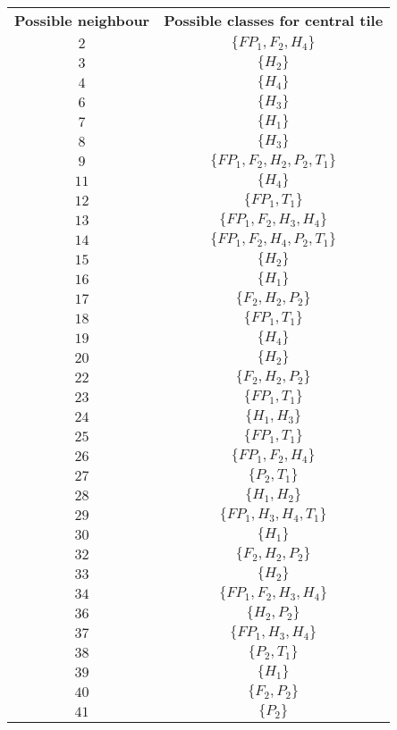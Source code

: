 \begin{table}[htp!]
\begin{center}
\begin{tabular}{|c|c|}
\textbf{Possible neighbour} & \textbf{Possible classes for central tile}\\
$2$ & $\{FP_1, F_2, H_4\}$\\
$3$ & $\{H_2\}$\\
$4$ & $\{H_4\}$\\
$6$ & $\{H_3\}$\\
$7$ & $\{H_1\}$\\
$8$ & $\{H_3\}$\\
$9$ & $\{FP_1, F_2, H_2, P_2, T_1\}$\\
$11$ & $\{H_4\}$\\
$12$ & $\{FP_1, T_1\}$\\
$13$ & $\{FP_1, F_2, H_3, H_4\}$\\
$14$ & $\{FP_1, F_2, H_4, P_2, T_1\}$\\
$15$ & $\{H_2\}$\\
$16$ & $\{H_1\}$\\
$17$ & $\{F_2, H_2, P_2\}$\\
$18$ & $\{FP_1, T_1\}$\\
$19$ & $\{H_4\}$\\
$20$ & $\{H_2\}$\\
$22$ & $\{F_2, H_2, P_2\}$\\
$23$ & $\{FP_1, T_1\}$\\
$24$ & $\{H_1, H_3\}$\\
$25$ & $\{FP_1, T_1\}$\\
$26$ & $\{FP_1, F_2, H_4\}$\\
$27$ & $\{P_2, T_1\}$\\
$28$ & $\{H_1, H_2\}$\\
$29$ & $\{FP_1, H_3, H_4, T_1\}$\\
$30$ & $\{H_1\}$\\
$32$ & $\{F_2, H_2, P_2\}$\\
$33$ & $\{H_2\}$\\
$34$ & $\{FP_1, F_2, H_3, H_4\}$\\
$36$ & $\{H_2, P_2\}$\\
$37$ & $\{FP_1, H_3, H_4\}$\\
$38$ & $\{P_2, T_1\}$\\
$39$ & $\{H_1\}$\\
$40$ & $\{F_2, P_2\}$\\
$41$ & $\{P_2\}$\\
\end{tabular}
\caption{}
\label{table:nbrclass}
\end{center}
\end{table}
